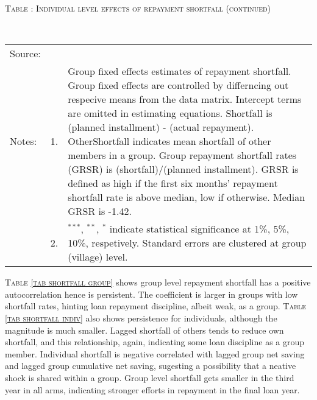 \hspace{-1cm}\begin{minipage}[t]{14cm}
\hfil\textsc{\normalsize Table \thetable: Individual level effects of repayment shortfall (continued)\label{tab shortfall indiv2}}\\
\setlength{\tabcolsep}{1pt}
\setlength{\baselineskip}{8pt}
\renewcommand{\arraystretch}{.6}
\hfil{}\\
\renewcommand{\arraystretch}{.8}
\setlength{\tabcolsep}{1pt}
\begin{tabular}{>{\hfill\scriptsize}p{1cm}<{}>{\hfill\scriptsize}p{.25cm}<{}>{\scriptsize}p{12cm}<{\hfill}}
Source:& \multicolumn{2}{l}{\scriptsize Estimated with GUK administrative data.}\\
Notes: & 1. & Group fixed effects estimates of repayment shortfall. Group fixed effects are controlled by differncing out respecive means from the data matrix. Intercept terms are omitted in estimating equations. Shortfall is (planned installment) - (actual repayment). OtherShortfall indicates mean shortfall of other members in a group. Group repayment shortfall rates (GRSR) is (shortfall)/(planned installment). GRSR is defined as high if the first six months' repayment shortfall rate is above median, low if otherwise. Median GRSR is -1.42.\\
& 2. & ${}^{***}$, ${}^{**}$, ${}^{*}$ indicate statistical significance at 1\%, 5\%, 10\%, respetively. Standard errors are clustered at group (village) level.
\end{tabular}
\end{minipage}

\begin{palepinkleftbar}
\begin{finding}
\textsc{\small Table \ref{tab shortfall group}} shows group level repayment shortfall has a positive autocorrelation hence is persistent. The coefficient is larger in groups with low shortfall rates, hinting loan repayment discipline, albeit weak, as a group. \textsc{\small Table \ref{tab shortfall indiv}} also shows persistence for individuals, although the magnitude is much smaller. Lagged shortfall of others tends to reduce own shortfall, and this relationship, again, indicating some loan discipline as a group member. Individual shortfall is negative correlated with lagged group net saving and lagged group cumulative net saving, sugesting a possibility that a neative shock is shared within a group. Group level shortfall gets smaller in the third year in all arms, indicating stronger efforts in repayment in the final loan year.  
\end{finding}
\end{palepinkleftbar}


